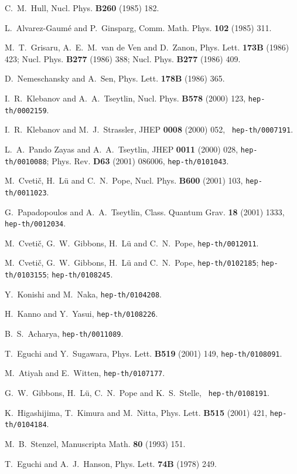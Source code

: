\documentclass[a4paper,11pt]{article}
\begin{document}
{\begin{thebibliography}{99}
C.~M.~Hull, Nucl. Phys. {\bf B260} (1985) 182.

L.~Alvarez-Gaum\'{e} and P.~Ginsparg,
Comm. Math. Phys. {\bf 102} (1985) 311.

M.~T.~Grisaru, A.~E.~M.~van de Ven and D.~Zanon,
Phys. Lett. {\bf 173B} (1986) 423;
Nucl. Phys. {\bf B277} (1986) 388;
Nucl. Phys. {\bf B277} (1986) 409.

D.~Nemeschansky and A.~Sen, Phys. Lett. {\bf 178B} (1986) 365.

I.~R.~Klebanov and A.~A.~Tseytlin, Nucl. Phys. {\bf B578} (2000)
123, {\tt hep-th/0002159}.

I.~R.~Klebanov and M.~J.~Strassler, JHEP {\bf 0008} (2000) 052, {\tt
hep-th/0007191}.

L.~A.~Pando Zayas and A.~A.~Tseytlin, JHEP {\bf 0011} (2000) 028, 
{\tt hep-th/0010088};  
Phys. Rev. {\bf D63} 
(2001) 086006, {\tt hep-th/0101043}.

M.~Cveti\v{c}, H.~L\"{u} and C.~N.~Pope, Nucl. Phys. {\bf B600} (2001)
103, {\tt hep-th/0011023}.

G.~Papadopoulos and A.~A.~Tseytlin, Class. Quantum Grav. {\bf 18} (2001)
1333, {\tt hep-th/0012034}.

M.~Cveti\v{c}, G.~W.~Gibbons, H.~L\"u and C.~N.~Pope, 
{\tt hep-th/0012011}.

M.~Cveti\v{c}, G.~W.~Gibbons, H.~L\"u and C.~N.~Pope, 
{\tt hep-th/0102185}; {\tt hep-th/0103155}; {\tt hep-th/0108245}.

Y.~Konishi and M.~Naka, {\tt hep-th/0104208}.

H.~Kanno and Y.~Yasui, {\tt hep-th/0108226}. 

B.~S.~Acharya, {\tt hep-th/0011089}.

T.~Eguchi and Y.~Sugawara, Phys. Lett. {\bf B519} (2001) 149, 
{\tt hep-th/0108091}.

M.~Atiyah and E.~Witten, {\tt hep-th/0107177}.

G.~W.~Gibbons, H.~L\"{u}, C.~N.~Pope and K.~S.~Stelle, {\tt
hep-th/0108191}.

K.~Higashijima, T.~Kimura and M.~Nitta, Phys. Lett. 
{\bf B515} (2001) 421, 
{\tt hep-th/0104184}. 

M.~B.~Stenzel, Manuscripta Math. {\bf 80} (1993) 151.

T.~Eguchi and A.~J.~Hanson, Phys. Lett. {\bf 74B} (1978) 249. 


\end{thebibliography}}
\end{document}
